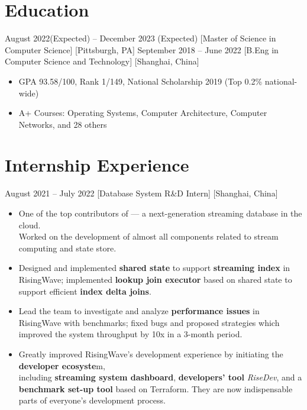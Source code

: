 \documentclass{chicv}
\begin{document}
\begin{basicinfo}
\end{basicinfo}

\section{Education}
  {August 2022(Expected) -- December 2023 (Expected)}
  [Master of Science in Computer Science]
  [Pittsburgh, PA]
  {September 2018 -- June 2022}
  [B.Eng in Computer Science and Technology]
  [Shanghai, China]
  \begin{itemize}
    \item GPA 93.58/100, Rank 1/149, National Scholarship 2019 (Top 0.2\% national-wide)
    \item A+ Courses: Operating Systems, Computer Architecture, Computer Networks, and 28 others
  \end{itemize}

\section{Internship Experience}

  {August 2021 – July 2022}
  [Database System R\&D Intern]
  [Shanghai, China]

\begin{itemize}
  \item One of the top contributors of  — a next-generation streaming database in the cloud. \\ Worked on the development of almost all components related to stream computing and state store.
  \item Designed and implemented \textbf{shared state} to support \textbf{streaming index} in RisingWave; implemented \textbf{lookup join executor} based on shared state to support efficient \textbf{index delta joins}.
  \item Lead the team to investigate and analyze \textbf{performance issues} in RisingWave with benchmarks; fixed bugs and proposed strategies which improved the system throughput by 10x in a 3-month period.
  \item Greatly improved RisingWave’s development experience by initiating the \textbf{developer ecosyste}m, \\including \textbf{streaming system dashboard}, \textbf{developers’ tool} \textit{RiseDev}, and a \textbf{benchmark set-up tool} based on Terraform. They are now indispensable parts of everyone’s development process.
\end{itemize}
\end{document}

